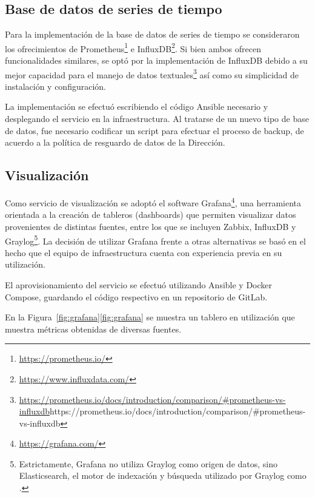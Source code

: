 \subsection{Base de datos de series de tiempo}

Para la implementación de la base de datos de series de tiempo se
consideraron los ofrecimientos de Prometheus\footnote{
  \href{https://prometheus.io/}{https://prometheus.io/} } e
InfluxDB\footnote{
  \href{https://www.influxdata.com/}{https://www.influxdata.com/}
}. Si bien ambos ofrecen funcionalidades similares, se optó por la
implementación de InfluxDB debido a su mejor capacidad para el manejo
de datos textuales\footnote{
  \url{https://prometheus.io/docs/introduction/comparison/\#prometheus-vs-influxdb}{https://prometheus.io/docs/introduction/comparison/\#prometheus-vs-influxdb}
} así como su simplicidad de instalación y configuración.

La implementación se efectuó escribiendo el código Ansible necesario y
desplegando el servicio en la infraestructura. Al tratarse de un nuevo
tipo de base de datos, fue necesario codificar un script para efectuar
el proceso de backup, de acuerdo a la política de resguardo de datos
de la Dirección.

\subsection{Visualización}

Como servicio de visualización se adoptó el software Grafana\footnote{
  \href{https://grafana.com/}{https://grafana.com/} }, una herramienta
orientada a la creación de tableros (dashboards) que permiten
visualizar datos provenientes de distintas fuentes, entre los que se
incluyen Zabbix, InfluxDB y Graylog\footnote{ Estrictamente, Grafana
  no utiliza Graylog como origen de datos, sino Elasticsearch, el
  motor de indexación y búsqueda utilizado por Graylog como
  .}. La decisión de utilizar Grafana frente a otras
alternativas se basó en el hecho que el equipo de infraestructura
cuenta con experiencia previa en su utilización.

El aprovisionamiento del servicio se efectuó utilizando Ansible y
Docker Compose, guardando el código respectivo en un repositorio de
GitLab.

En la
\iflatexml{}Figura~\ref{fig:grafana}\else\autoref{fig:grafana}\fi{} se
muestra un tablero en utilización que muestra métricas obtenidas de
diversas fuentes.
